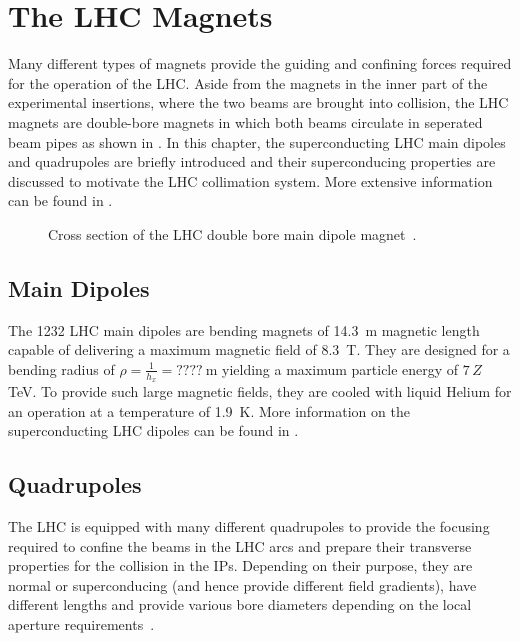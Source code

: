 \section{The LHC Magnets}

Many different types of magnets provide the guiding and confining forces required for the operation of the LHC. Aside from the magnets in the inner part of the experimental insertions, where the two beams are brought into collision, the LHC magnets are double-bore magnets in which both beams circulate in seperated beam pipes as shown in . In this chapter, the superconducting LHC main dipoles and quadrupoles are briefly introduced and their superconducing properties are discussed to motivate the LHC collimation system. More extensive information can be found in \citedr.

\begin{figure}[b]
  \centering
  \caption{Cross section of the LHC double bore main dipole magnet~\cite{Valeriane:843195}.}  
  \label{pic:16070405}
  \end{figure}


\subsection{Main Dipoles}

The 1232 LHC main dipoles are bending magnets of 14.3~m magnetic length capable of delivering a maximum magnetic field of 8.3~T. They are designed for a bending radius of $\rho=\frac{1}{h_x} = ????~\text{m}$ yielding a maximum particle energy of $7\,Z\,$TeV. To provide such large magnetic fields, they are cooled with liquid Helium for an operation at a temperature of 1.9~K. More information on the superconducting LHC dipoles can be found in \citedr.
%
\subsection{Quadrupoles}
The LHC is equipped with many different quadrupoles to provide the focusing required to confine the beams in the LHC arcs and prepare their transverse properties for the collision in the IPs. Depending on their purpose, they are normal or superconducing (and hence provide different field gradients), have different lengths and provide various bore diameters depending on the local aperture requirements~\citedr. 

